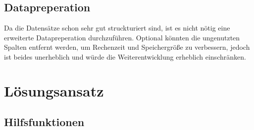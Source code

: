 \documentclass{article}
\begin{document}
\subsection{Datapreperation}
Da die Datensätze schon sehr gut struckturiert sind, ist es nicht nötig eine erweiterte Datapreperation durchzuführen.
Optional könnten die ungenutzten Spalten entfernt werden, um Rechenzeit und Speichergröße zu verbessern, jedoch ist beides unerheblich und würde die Weiterentwicklung erheblich einschränken.

\section{Lösungsansatz}
\subsection{Hilfsfunktionen}
\end{document}
